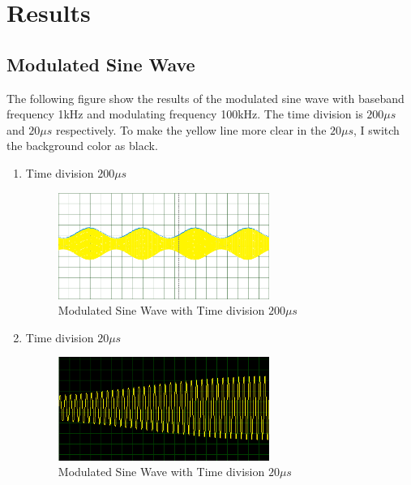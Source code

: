 \documentclass [utf8] {article}
\begin{document}
\section{Results}
{
	\subsection{Modulated Sine Wave}
	The following figure show the results of the modulated sine wave with baseband frequency 1kHz and modulating frequency 100kHz. The time division is $200\mu s$ and $20\mu s$ respectively. To make the yellow line more clear in the $20\mu s$, I switch the background color as black.
	\begin{enumerate}
		\item Time division $200\mu s$
		\begin{figure}[H]
			\begin{small}
				\begin{center}
					\includegraphics[width=0.65\textwidth]{figures/Figure15.png}
				\end{center}
				\caption{Modulated Sine Wave with Time division $200\mu s$}
				\label{fig:fig-1-1}
			\end{small}
		\end{figure}

		\item Time division $20\mu s$
		\begin{figure}[H]
			\begin{small}
				\begin{center}
					\includegraphics[width=0.65\textwidth]{figures/Figure16.png}
				\end{center}
				\caption{Modulated Sine Wave with Time division $20\mu s$}
				\label{fig:fig-1-2}
			\end{small}
		\end{figure}
		

\end{enumerate}}
\end{document}
